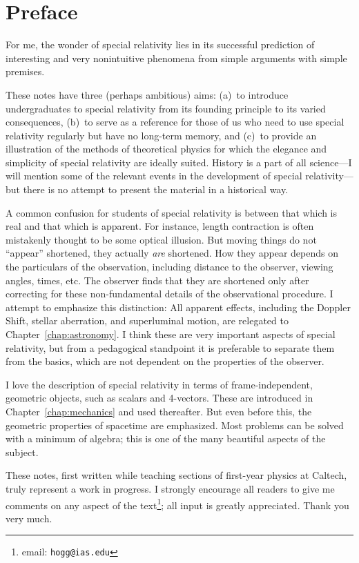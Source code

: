 \section*{Preface}

For me, the wonder of special relativity lies in its successful
prediction of interesting and very nonintuitive phenomena from simple
arguments with simple premises.

These notes have three (perhaps ambitious) aims: (a)~to introduce
undergraduates to special relativity from its founding principle to
its varied consequences, (b)~to serve as a reference for those of us
who need to use special relativity regularly but have no long-term
memory, and (c)~to provide an illustration of the methods of
theoretical physics for which the elegance and simplicity of special
relativity are ideally suited.  History is a part of all science---I
will mention some of the relevant events in the development of special
relativity---but there is no attempt to present the material in a
historical way.

A common confusion for students of special relativity is between that
which is real and that which is apparent.  For instance, length
contraction is often mistakenly thought to be some optical illusion.
But moving things do not ``appear'' shortened, they actually {\em
are\/} shortened.  How they appear depends on the particulars of the
observation, including distance to the observer, viewing angles,
times, etc.  The observer finds that they are shortened only after
correcting for these non-fundamental details of the observational
procedure.  I attempt to emphasize this distinction: All apparent
effects, including the Doppler Shift, stellar aberration, and
superluminal motion, are relegated to Chapter~\ref{chap:astronomy}.  I
think these are very important aspects of special relativity, but from
a pedagogical standpoint it is preferable to separate them from the
basics, which are not dependent on the properties of the observer.

I love the description of special relativity in terms of
frame-independent, geometric objects, such as scalars and 4-vectors.
These are introduced in Chapter~\ref{chap:mechanics} and used
thereafter.  But even before this, the geometric properties of
spacetime are emphasized.  Most problems can be solved with a minimum
of algebra; this is one of the many beautiful aspects of the subject.

These notes, first written while teaching sections of first-year
physics at Caltech, truly represent a work in progress.  I strongly
encourage all readers to give me comments on any aspect of the
text\footnote{email: {\tt hogg@ias.edu}}; all input is greatly
appreciated.  Thank you very much.


